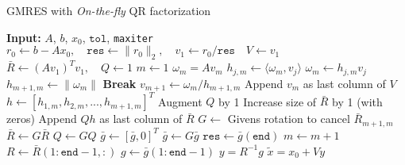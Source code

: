 \begin{algorithm}\caption{GMRES with \textit{On-the-fly} QR factorization }
    \label{algo:GMRES}
    \begin{algorithmic}
    \State \textbf{Input:} \(A\), \(b\), \(x_0\), \(\texttt{tol}\), \texttt{maxiter}
     \State \(r_0 \gets b-Ax_0, \quad \texttt{res} \gets \|r_0\|_2, \quad v_1 \gets r_0 / \texttt{res} \quad V\gets v_1\) 
     \State \(\bar{R} \gets (Av_1)^T v_1, \quad Q \gets 1\) 
     \State \(m \gets 1\)
     \State \(\omega_m = A v_m\) 
      
     \State \(h_{j,m} \gets \langle \omega_m, v_j \rangle\)
     \State \(\omega_m \gets h_{j,m}v_j\)
     \EndFor
     \State \(h_{m+1, m} \gets \| \omega_m \|\)
      
     \State \textbf{Break}
     \EndIf
     \State \(v_{m+1} \gets \omega_m / h_{m+1, m}\)
     \State Append \(v_m\) as last column of \(V\)
     \State \(h \gets [h_{1, m}, h_{2,m}, ... , h_{m+1, m}]^T\) 
     \State Augment \(Q\) by 1
     \State Increase size of \(\bar{R}\) by 1 (with zeros)
     \State Append \(Qh\) as last column of \(\bar{R}\)
     \State \(G \gets\) Givens rotation to cancel \(\bar{R}_{m+1, m}\) 
     \State \(\bar{R} \gets G \bar{R}\) 
     \State \(Q \gets GQ\) 
     \State \(\bar{g} \gets [\bar{g}, 0]^T\)
     \State \(\bar{g} \gets G \bar{g}\)
     \State \(\texttt{res} \gets \bar{g}(\texttt{end})\)
     \State \(m \gets m+1\)
     \EndWhile
     \State \(R \gets \bar{R}(1:\texttt{end}-1, :)\)
     \State \(g \gets \bar{g}(1:\texttt{end}-1)\)
     \State \(y = R^{-1}g\) 
     \State \Return \(\tilde{x} = x_0 + Vy\)
    \end{algorithmic}            
  \end{algorithm}


